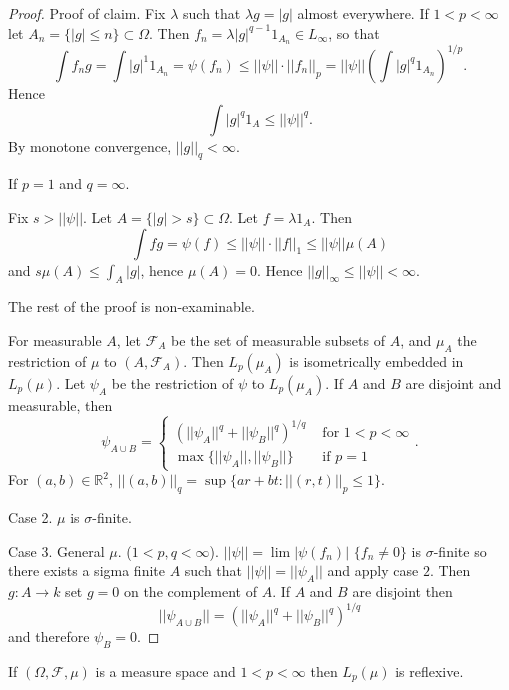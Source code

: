 \begin{proof}
  Proof of claim.
  Fix $\lambda$ such that $\lambda g=|g|$ almost everywhere.
  If $1<p<\infty$ let $A_n =\{ |g|\leq n\}\subset \Omega$.
  Then $f_n=\lambda |g|^{q-1}1_{A_n}\in L_\infty$,
  so that
  $$\int f_n g=\int |g|^{1} 1_{A_n}=\psi(f_n)\leq ||\psi||\cdot ||f_n||_p =||\psi||\left(\int |g|^q 1_{A_n}\right)^{1/p}.$$
  Hence $$\int |g|^q 1_A \leq ||\psi||^q.$$
  By monotone convergence, $||g||_q<\infty$.

  If $p=1$ and $q=\infty$.

  Fix $s>||\psi ||$.
  Let $A=\{|g|>s\}\subset \Omega$.
  Let $f=\lambda 1_A$.
  Then $$\int fg= \psi(f)\leq ||\psi|| \cdot ||f||_1\leq ||\psi||\mu(A)$$
  and $s\mu(A)\leq \int_A|g|$,
  hence $\mu(A)=0$.
  Hence $||g||_\infty\leq ||\psi||<\infty$.

  The rest of the proof is non-examinable.

  For measurable $A$, let $\mathcal{F}_A$ be the set of measurable subsets of $A$,
  and $\mu_A$ the restriction of $\mu$ to $(A,\mathcal{F}_A)$.
  Then $L_p(\mu_A)$ is isometrically embedded in $L_p(\mu)$.
  Let $\psi_A$ be the restriction of $\psi$ to $L_p(\mu_A)$.
  If $A$ and $B$ are disjoint and measurable,
  then
  $$\psi_{A\cup B}=\begin{cases}
  (||\psi_A||^q+||\psi_B||^q)^{1/q} &\text{ for $1<p<\infty$}\\
  \max \{||\psi_A||,||\psi_B||\}& \text{ if $p=1$}
  \end{cases}.$$
  For $(a,b)\in\mathbb{R}^2$, $||(a,b)||_q=\sup\{ar+bt:||(r,t)||_p\leq 1\}$.

  Case 2. $\mu$ is $\sigma$-finite.

  Case 3. General $\mu$. ($1<p,q<\infty$).
  $||\psi||=\lim |\psi(f_n)|$
  $\{f_n\neq 0\}$ is $\sigma$-finite
  so there exists a sigma finite $A$ such that $||\psi||=||\psi_A||$
  and apply case $2$.
  Then $g:A\to k$ set $g=0$ on the complement of $A$.
  If $A$ and $B$ are disjoint then
  $$||\psi_{A\cup B}||=(||\psi_A||^q+||\psi_B||^q)^{1/q}$$
  and therefore $\psi_B=0$.
\end{proof}

\begin{corollary}
  If $(\Omega,\mathcal{F},\mu)$ is a measure space and $1<p<\infty$
  then $L_p(\mu)$ is reflexive.
\end{corollary}

